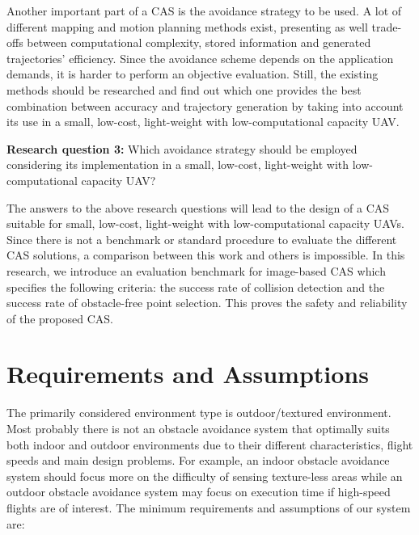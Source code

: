 Another important part of a \ac{CAS} is the avoidance strategy to be used. A lot of different mapping and motion planning methods exist, presenting as well trade-offs between computational complexity, stored information and generated trajectories' efficiency. Since the avoidance scheme depends on the application demands, it is harder to perform an objective evaluation. Still, the existing methods should be researched and find out which one provides the best combination between accuracy and trajectory generation by taking into account its use in a small, low-cost, light-weight with low-computational capacity \acs{UAV}.

\begin{description}
	\item \textbf{Research question 3:} Which avoidance strategy should be employed considering its implementation in a small, low-cost, light-weight with low-computational capacity \acs{UAV}?
\end{description}

The answers to the above research questions will lead to the design of a \ac{CAS} suitable for small, low-cost, light-weight with low-computational capacity \acp{UAV}. Since there is not a benchmark or standard procedure to evaluate the different \ac{CAS} solutions, a comparison between this work and others is impossible. In this research, we introduce an evaluation benchmark for image-based \ac{CAS} which specifies the following criteria: the success rate of collision detection and the success rate of obstacle-free point selection. This proves the safety and reliability of the proposed \ac{CAS}.

\section{Requirements and Assumptions}

The primarily considered environment type is outdoor/textured environment. Most probably there is not an obstacle avoidance system that optimally suits both indoor and outdoor environments due to their different characteristics, flight speeds and main design problems. For example, an indoor obstacle avoidance system should focus more on the difficulty of sensing texture-less areas while an outdoor obstacle avoidance system may focus on execution time if high-speed flights are of interest. The minimum requirements and assumptions of our system are:

